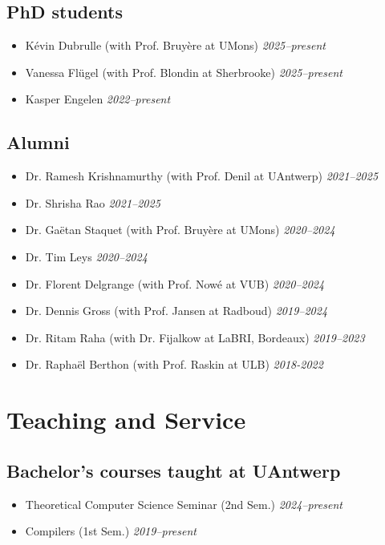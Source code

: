 \documentclass[10pt,a4paper]{moderncv}
\begin{document}
\subsection{PhD students}
\begin{itemize}
  \item K\'evin Dubrulle (with Prof. Bruy\`ere at UMons) \hfill
    \textit{2025--present}
  \item Vanessa Fl\"ugel (with Prof. Blondin at Sherbrooke) \hfill \textit{2025--present}
  \item Kasper Engelen \hfill \textit{2022--present}
\end{itemize}

\subsection{Alumni}
\begin{itemize}
  \item Dr. Ramesh Krishnamurthy (with Prof. Denil at UAntwerp) \hfill
    \textit{2021--2025}
  \item Dr. Shrisha Rao \hfill \textit{2021--2025}
  \item Dr. Ga\"etan Staquet (with Prof. Bruy\`ere at UMons) \hfill
    \textit{2020--2024}
  \item Dr. Tim Leys \hfill \textit{2020--2024}
  \item Dr. Florent Delgrange (with Prof. Now\'e at VUB) \hfill
    \textit{2020--2024}
  \item Dr. Dennis Gross (with Prof. Jansen at Radboud) \hfill
    \textit{2019--2024} 
  \item Dr. Ritam Raha (with Dr. Fijalkow at LaBRI, Bordeaux) \hfill
    \textit{2019--2023}
  \item Dr. Rapha\"el Berthon (with Prof. Raskin at ULB) \hfill
    \textit{2018-2022}
\end{itemize}

\section{Teaching and Service}
\subsection{Bachelor's courses taught at UAntwerp}
\begin{itemize}
  \item Theoretical Computer Science Seminar (2nd Sem.) \hfill
    \textit{2024--present}
  \item Compilers (1st Sem.) \hfill \textit{2019--present}
\end{itemize}
\end{document}
